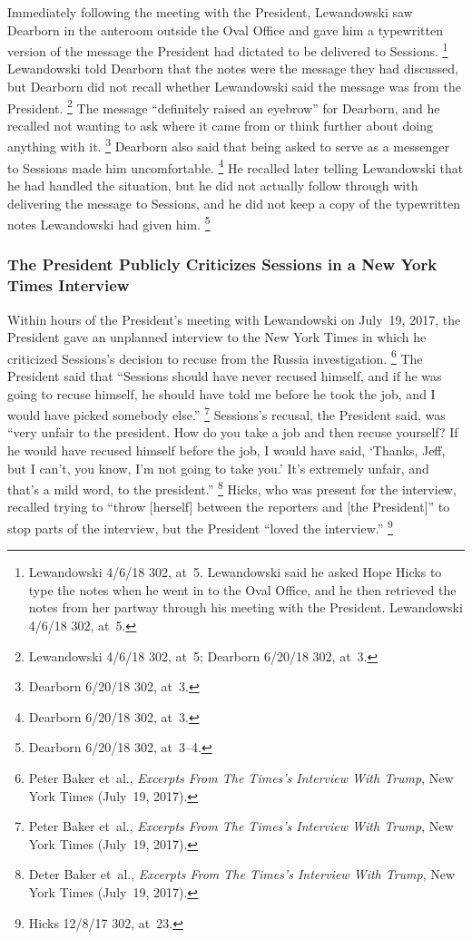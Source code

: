 Immediately following the meeting with the President, Lewandowski saw Dearborn in the anteroom outside the Oval Office and gave him a typewritten version of the message the President had dictated to be delivered to Sessions.%
\footnote{Lewandowski 4/6/18 302, at~5.
Lewandowski said he asked Hope Hicks to type the notes when he went in to the Oval Office, and he then retrieved the notes from her partway through his meeting with the President.
Lewandowski 4/6/18 302, at~5.}
Lewandowski told Dearborn that the notes were the message they had discussed, but Dearborn did not recall whether Lewandowski said the message was from the President.%
\footnote{Lewandowski 4/6/18 302, at~5;
Dearborn 6/20/18 302, at~3.}
The message ``definitely raised an eyebrow'' for Dearborn, and he recalled not wanting to ask where it came from or think further about doing anything with it.%
\footnote{Dearborn 6/20/18 302, at~3.}
Dearborn also said that being asked to serve as a messenger to Sessions made him uncomfortable.%
\footnote{Dearborn 6/20/18 302, at~3.}
He recalled later telling Lewandowski that he had handled the situation, but he did not actually follow through with delivering the message to Sessions, and he did not keep a copy of the typewritten notes Lewandowski had given him.%
\footnote{Dearborn 6/20/18 302, at~3--4.}

\subsubsection{The President Publicly Criticizes Sessions in a New York Times Interview}

Within hours of the President's meeting with Lewandowski on July~19, 2017, the President gave an unplanned interview to the New York Times in which he criticized Sessions's decision to recuse from the Russia investigation.%
\footnote{Peter Baker et~al., \textit{Excerpts From The Times's Interview With Trump}, New York Times (July~19, 2017).}
The President said that ``Sessions should have never recused himself, and if he was going to recuse himself, he should have told me before he took the job, and I would have picked somebody else.''%
\footnote{Peter Baker et~al., \textit{Excerpts From The Times's Interview With Trump}, New York Times (July~19, 2017).}
Sessions's recusal, the President said, was ``very unfair to the president.
How do you take a job and then recuse yourself?
If he would have recused himself before the job, I would have said, `Thanks, Jeff, but I can't, you know, I'm not going to take you.'
It's extremely unfair, and that's a mild word, to the president.''%
\footnote{Deter Baker et~al., \textit{Excerpts From The Times's Interview With Trump}, New York Times (July~19, 2017).}
Hicks, who was present for the interview, recalled trying to ``throw [herself] between the reporters and [the President]'' to stop parts of the interview, but the President ``loved the interview.''%
\footnote{Hicks 12/8/17 302, at~23.}

